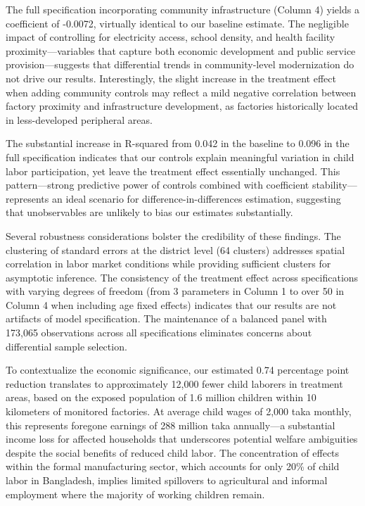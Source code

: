 \documentclass[12pt]{article}
\begin{document}
The full specification incorporating community infrastructure (Column 4) yields a coefficient of -0.0072, virtually identical to our baseline estimate. The negligible impact of controlling for electricity access, school density, and health facility proximity—variables that capture both economic development and public service provision—suggests that differential trends in community-level modernization do not drive our results. Interestingly, the slight increase in the treatment effect when adding community controls may reflect a mild negative correlation between factory proximity and infrastructure development, as factories historically located in less-developed peripheral areas.

The substantial increase in R-squared from 0.042 in the baseline to 0.096 in the full specification indicates that our controls explain meaningful variation in child labor participation, yet leave the treatment effect essentially unchanged. This pattern—strong predictive power of controls combined with coefficient stability—represents an ideal scenario for difference-in-differences estimation, suggesting that unobservables are unlikely to bias our estimates substantially.

Several robustness considerations bolster the credibility of these findings. The clustering of standard errors at the district level (64 clusters) addresses spatial correlation in labor market conditions while providing sufficient clusters for asymptotic inference. The consistency of the treatment effect across specifications with varying degrees of freedom (from 3 parameters in Column 1 to over 50 in Column 4 when including age fixed effects) indicates that our results are not artifacts of model specification. The maintenance of a balanced panel with 173,065 observations across all specifications eliminates concerns about differential sample selection.

To contextualize the economic significance, our estimated 0.74 percentage point reduction translates to approximately 12,000 fewer child laborers in treatment areas, based on the exposed population of 1.6 million children within 10 kilometers of monitored factories. At average child wages of 2,000 taka monthly, this represents foregone earnings of 288 million taka annually—a substantial income loss for affected households that underscores potential welfare ambiguities despite the social benefits of reduced child labor. The concentration of effects within the formal manufacturing sector, which accounts for only 20\% of child labor in Bangladesh, implies limited spillovers to agricultural and informal employment where the majority of working children remain.
\end{document}
